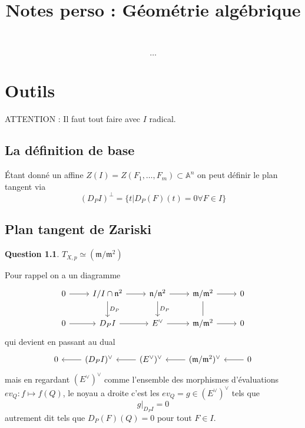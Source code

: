 \documentclass[a4paper,12pt]{book}
\title{Notes perso : Géométrie algébrique}
\date{}
\newcommand{\A}{\mathbb{A}}
\newcommand{\m}{\mathfrak{m}}
\theoremstyle{plain}
\theoremstyle{definition}
\newtheorem{quest}{Question}
\theoremstyle{remark}
\begin{document}
\maketitle
\tableofcontents
\[\ldots\]   

\chapter{Outils}
ATTENTION : Il faut tout faire avec $I$ radical.
\section{La définition de base}
Étant donné un affine $Z(I)=Z(F_1,\ldots, F_m)\subset\A^n$ 
on peut définir le plan tangent via
\[(D_PI)^\perp =\{t| D_P(F)(t)=0 \forall F\in I\}\]
\section{Plan tangent de Zariski}
\begin{quest}
    $T_{X,p}\simeq (\m/\m^2)$
\end{quest}
Pour rappel on a un diagramme 
\[\begin{tikzcd}
	0 & {I/I\cap \mathfrak n^2} & {\mathfrak n/\mathfrak n^2} & {\mathfrak m/\mathfrak m^2} & 0 \\
	0 & {D_PI} & {E^\vee} & {\mathfrak m/\mathfrak m^2} & 0
	\arrow[from=1-1, to=1-2]
	\arrow[from=1-2, to=1-3]
	\arrow["{D_P}", from=1-2, to=2-2]
	\arrow[from=1-3, to=1-4]
	\arrow["{D_P}", from=1-3, to=2-3]
	\arrow[from=1-4, to=1-5]
	\arrow[no head, from=1-4, to=2-4]
	\arrow[from=2-1, to=2-2]
	\arrow[from=2-2, to=2-3]
	\arrow[from=2-3, to=2-4]
	\arrow[from=2-4, to=2-5]
\end{tikzcd}\]
qui devient en passant au dual
\[\begin{tikzcd}
	0 & {(D_PI)^\vee} & {(E^\vee)^\vee} & {(\mathfrak m/\mathfrak m^2)^\vee} & 0
	\arrow[from=1-2, to=1-1]
	\arrow[from=1-3, to=1-2]
	\arrow[from=1-4, to=1-3]
	\arrow[from=1-5, to=1-4]
\end{tikzcd}\]
mais en regardant $(E^\vee)^\vee$ comme l'ensemble des
morphismes d'évaluations $ev_Q\colon f\mapsto f(Q)$, le noyau 
a droite c'est les $ev_Q=g\in(E^\vee)^\vee$ tels que 
\[g|_{D_PI}=0\] autrement dit tels que $D_P(F)(Q)=0$ pour tout
$F\in I$.
\end{document}

